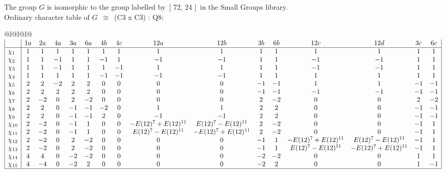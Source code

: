 \documentclass[varwidth=\maxdimen,border=10]{standalone}
\begin{document}
The group $G$ is isomorphic to the group labelled by\ [ 72, 24 ]\ in the Small Groups library.\\
Ordinary character table of $G$\ $\cong$\ (C3 x C3) : Q8:\\
\begin{center}
\begin{tabular}{@{}l@{}l@{}l@{}}
\hline
\(\begin{array}{|l|ccccccccccccccc|}
  & 1a & 2a & 4a & 3a & 6a & 4b & 4c & 12a & 12b & 3b & 6b & 12c & 12d & 3c & 6c\\ \hline
\chi_{1} & 1 & 1 & 1 & 1 & 1 & 1 & 1 & 1 & 1 & 1 & 1 & 1 & 1 & 1 & 1\\
\chi_{2} & 1 & 1 & -1 & 1 & 1 & -1 & 1 & -1 & -1 & 1 & 1 & -1 & -1 & 1 & 1\\
\chi_{3} & 1 & 1 & -1 & 1 & 1 & 1 & -1 & 1 & 1 & 1 & 1 & -1 & -1 & 1 & 1\\
\chi_{4} & 1 & 1 & 1 & 1 & 1 & -1 & -1 & -1 & -1 & 1 & 1 & 1 & 1 & 1 & 1\\
\chi_{5} & 2 & 2 & -2 & 2 & 2 & 0 & 0 & 0 & 0 & -1 & -1 & 1 & 1 & -1 & -1\\
\chi_{6} & 2 & 2 & 2 & 2 & 2 & 0 & 0 & 0 & 0 & -1 & -1 & -1 & -1 & -1 & -1\\
\chi_{7} & 2 & -2 & 0 & 2 & -2 & 0 & 0 & 0 & 0 & 2 & -2 & 0 & 0 & 2 & -2\\
\chi_{8} & 2 & 2 & 0 & -1 & -1 & -2 & 0 & 1 & 1 & 2 & 2 & 0 & 0 & -1 & -1\\
\chi_{9} & 2 & 2 & 0 & -1 & -1 & 2 & 0 & -1 & -1 & 2 & 2 & 0 & 0 & -1 & -1\\
\chi_{10} & 2 & -2 & 0 & -1 & 1 & 0 & 0 & -E(12)^{7}+E(12)^{11} & E(12)^{7}-E(12)^{11} & 2 & -2 & 0 & 0 & -1 & 1\\
\chi_{11} & 2 & -2 & 0 & -1 & 1 & 0 & 0 & E(12)^{7}-E(12)^{11} & -E(12)^{7}+E(12)^{11} & 2 & -2 & 0 & 0 & -1 & 1\\
\chi_{12} & 2 & -2 & 0 & 2 & -2 & 0 & 0 & 0 & 0 & -1 & 1 & -E(12)^{7}+E(12)^{11} & E(12)^{7}-E(12)^{11} & -1 & 1\\
\chi_{13} & 2 & -2 & 0 & 2 & -2 & 0 & 0 & 0 & 0 & -1 & 1 & E(12)^{7}-E(12)^{11} & -E(12)^{7}+E(12)^{11} & -1 & 1\\
\chi_{14} & 4 & 4 & 0 & -2 & -2 & 0 & 0 & 0 & 0 & -2 & -2 & 0 & 0 & 1 & 1\\
\chi_{15} & 4 & -4 & 0 & -2 & 2 & 0 & 0 & 0 & 0 & -2 & 2 & 0 & 0 & 1 & -1\\
\hline
\end{array}\)\\
\end{tabular}
\end{center}
\end{document}
